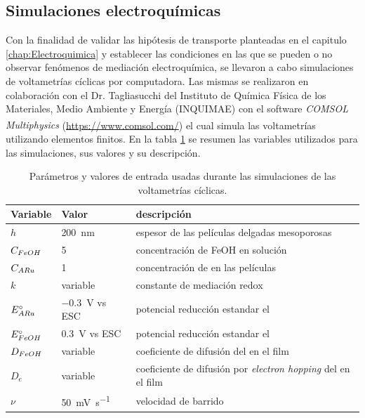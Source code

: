 	 \subsection{Simulaciones electroquímicas}\label{simulacion}

	 	 Con la finalidad de validar las hipótesis de transporte planteadas en el capitulo \ref{chap:Electroquimica} y establecer las condiciones en las que se pueden o no observar fenómenos de mediación electroquímica, se llevaron a cabo simulaciones de voltametrías cíclicas por computadora. Las mismas se realizaron en colaboración con el Dr. Tagliasucchi del Instituto de Química Física de los Materiales, Medio Ambiente y Energía (INQUIMAE) con el software \textit{COMSOL Multiphysics\textsuperscript\textregistered} (\url{https://www.comsol.com/}) el cual simula las voltametrías utilizando elementos finitos. En la tabla \ref{tabla:simulacion} se resumen las variables utilizados para las simulaciones, sus valores y su descripción.
	 	
	    	\begin{table}[ht!]
	 	    \caption[Parámetros de las simulacinoes]{Parámetros y valores de entrada usadas durante las simulaciones de las voltametrías cíclicas.}
	 	    \begin{tabular}{>{\raggedright\arraybackslash}m{1.4cm}>{\centering\arraybackslash}m{2.8cm}>{\raggedright\arraybackslash}m{6.7cm}} 
	 	    \toprule
	 	    Variable  & 	Valor  &   descripción      \\ \midrule
	 	    $h$  	  &    \SI{200}{nm}	& 	   espesor de las películas delgadas mesoporosas 	    \\ \midrule
	 	    $C_{\fc}$  & \SI{5}{\milli\Molar}  & concentración de FeOH en solución    \\ \midrule
	 	    $C_{\ru}$ & \SI{1}{\milli\Molar}  & concentración de \ru\space en las películas    \\ \midrule
	 	    $k$ 		   & variable 	 & 	constante de mediación redox    \\ \midrule
	 	    $E^\circ_{\ru}$  & \SI{-0.3}{\volt} vs ESC & potencial reducción estandar el \ru \\ \midrule
	 	    $E^\circ_{\fc}$  & \SI{0.3}{\volt} vs ESC & potencial reducción estandar el \fc \\ \midrule
	 	    $D_{\fc}$  & variable & coeficiente de difusión del \fc\space en el film \\ \midrule
	 	    $D_{e}$  & variable & coeficiente de difusión por \textit{electron hopping }del \ru\space en el film \\ \midrule
	 	    $\nu$    & \SI{50}{\milli\volt\per\second}  &  velocidad de barrido \\
	 	     \bottomrule
			\end{tabular}
			\label{tabla:simulacion}
			\end{table} 

